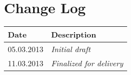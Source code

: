 \section{Change Log}
\label{sec:changelog}
\begin{tabular}{|l|l|}
\hline
Date & Description \\ \hline
05.03.2013 & \emph{Initial draft\/} \\ \hline
11.03.2013 & \emph{Finalized for delivery\/} \\ \hline
\end{tabular}
